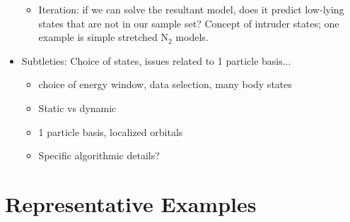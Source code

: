 \documentclass[prl,12pt,onecolumn,nofootinbib,notitlepage,english,superscriptaddress]{revtex4-1}
\begin{document}
\begin{itemize}
\begin{itemize}
   \item Iteration: if we can solve the resultant model, does it predict low-lying states that are not in our sample set? Concept of intruder states; one example is simple stretched N$_2$ models.
   \end{itemize}

\item Subtleties: Choice of states, issues related to 1 particle basis...
	\begin{itemize}
	\item choice of energy window, data selection, many body states
	\item Static vs dynamic
	\item 1 particle basis, localized orbitals
	\item Specific algorithmic details?
	\end{itemize}

\end{itemize}


\section{Representative Examples}
\end{document}
